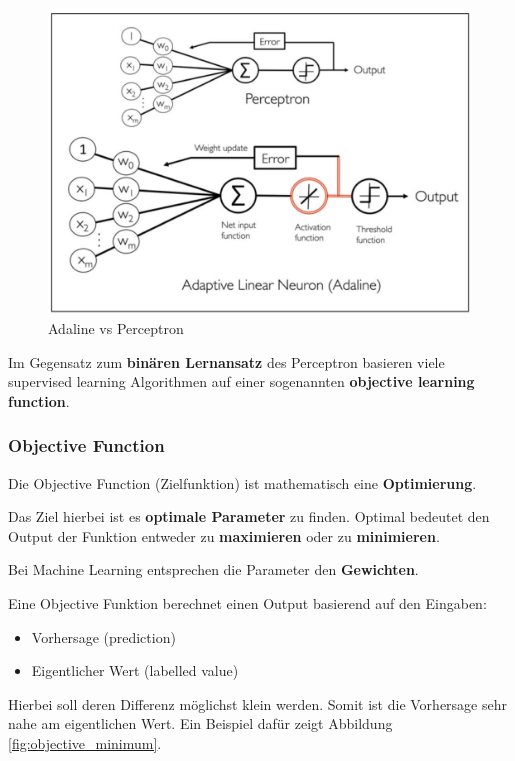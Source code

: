 \begin{figure}[h!]
	\includegraphics[scale=0.6]{figures/adaline_vs_perceptron}
	\caption{Adaline vs Perceptron}
	\label{fig:adaline_vs_perceptron}
\end{figure}

Im Gegensatz zum \textbf{binären Lernansatz} des Perceptron basieren viele supervised learning Algorithmen auf einer sogenannten \textbf{objective learning function}.


\newpage
\subsubsection{Objective Function}

Die Objective Function (Zielfunktion) ist mathematisch eine \textbf{Optimierung}.

Das Ziel hierbei ist es \textbf{optimale Parameter} zu finden. Optimal bedeutet den Output der Funktion entweder zu \textbf{maximieren} oder zu \textbf{minimieren}. 


Bei Machine Learning entsprechen die Parameter den \textbf{Gewichten}.


Eine Objective Funktion berechnet einen Output basierend auf den Eingaben:

\begin{itemize}
  \item Vorhersage (prediction)
  \item Eigentlicher Wert (labelled value)
\end{itemize}

Hierbei soll deren Differenz möglichst klein werden. Somit ist die Vorhersage sehr nahe am eigentlichen Wert. Ein Beispiel dafür zeigt Abbildung \ref{fig:objective_minimum}. 


